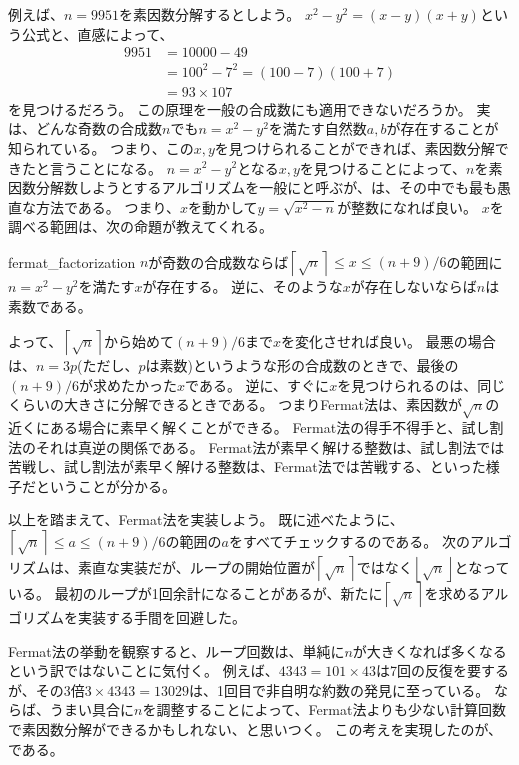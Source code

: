 例えば、$n=9951$を素因数分解するとしよう。
$x^2-y^2 = (x-y)(x+y)$という公式と、直感によって、
\begin{align*}
9951 &= 10000 - 49\\
&= 100^2 - 7^2 = (100 - 7)(100 + 7)\\
&= 93 \times 107
\end{align*}
を見つけるだろう。
この原理を一般の合成数にも適用できないだろうか。
実は、どんな奇数の合成数$n$でも$n=x^2-y^2$を満たす自然数$a,b$が存在することが知られている。
つまり、この$x,y$を見つけられることができれば、素因数分解できたと言うことになる。
$n=x^2-y^2$となる$x,y$を見つけることによって、$n$を素因数分解数しようとするアルゴリズムを一般にと呼ぶが、は、その中でも最も愚直な方法である。
つまり、$x$を動かして$y=\sqrt{x^2-n}$が整数になれば良い。
$x$を調べる範囲は、次の命題が教えてくれる。

\begin{Prop}{}{fermat_factorization}
$n$が奇数の合成数ならば$\left \lceil\sqrt{n}\right \rceil\le x \le (n + 9) / 6$の範囲に$n=x^2-y^2$を満たす$x$が存在する。
逆に、そのような$x$が存在しないならば$n$は素数である。
\end{Prop}

よって、$\left \lceil\sqrt{n}\right \rceil$から始めて$(n + 9) / 6$まで$x$を変化させれば良い。
最悪の場合は、$n=3p$(ただし、$p$は素数)というような形の合成数のときで、最後の$(n + 9) / 6$が求めたかった$x$である。
逆に、すぐに$x$を見つけられるのは、同じくらいの大きさに分解できるときである。
つまりFermat法は、素因数が$\sqrt{n}$の近くにある場合に素早く解くことができる。
Fermat法の得手不得手と、試し割法のそれは真逆の関係である。
Fermat法が素早く解ける整数は、試し割法では苦戦し、試し割法が素早く解ける整数は、Fermat法では苦戦する、といった様子だということが分かる。

以上を踏まえて、Fermat法を実装しよう。
既に述べたように、$\left \lceil\sqrt{n}\right \rceil \le a \le (n + 9) / 6$の範囲の$a$をすべてチェックするのである。
次のアルゴリズムは、素直な実装だが、ループの開始位置が$\left \lceil\sqrt{n}\right \rceil$ではなく$\left \lfloor\sqrt{n}\right \rfloor$となっている。
最初のループが1回余計になることがあるが、新たに$\left \lceil\sqrt{n}\right \rceil$を求めるアルゴリズムを実装する手間を回避した。


Fermat法の挙動を観察すると、ループ回数は、単純に$n$が大きくなれば多くなるという訳ではないことに気付く。
例えば、$4343=101\times43$は7回の反復を要するが、その3倍$3\times4343=13029$は、1回目で非自明な約数の発見に至っている。
ならば、うまい具合に$n$を調整することによって、Fermat法よりも少ない計算回数で素因数分解ができるかもしれない、と思いつく。
この考えを実現したのが、である。

